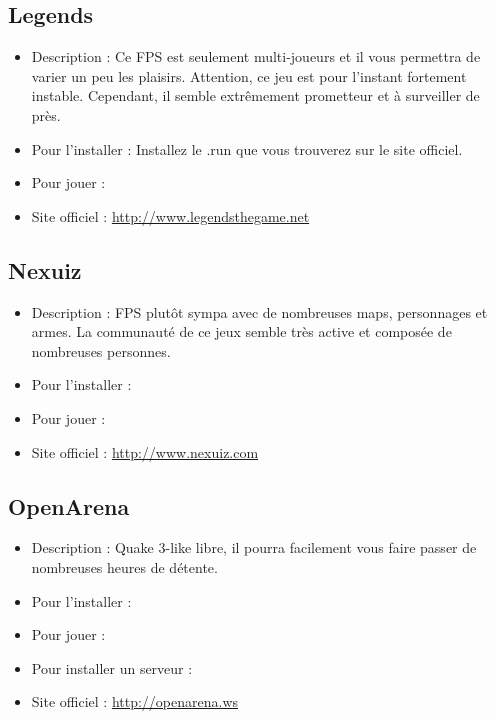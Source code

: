 \subsection{Legends}
\begin{itemize}
\begingroup
{}
\item Description : Ce FPS est seulement multi-joueurs et il vous permettra de varier un peu les plaisirs. Attention, ce jeu est pour l'instant fortement instable. Cependant, il semble extrêmement prometteur et à surveiller de près.{\par}
\endgroup
\item Pour l'installer : Installez le .run que vous trouverez sur le site officiel.{\par}
\item Pour jouer : 
\item Site officiel : \url{http://www.legendsthegame.net}{\par}
\end{itemize}
\subsection{Nexuiz}
\begin{itemize}
\begingroup
{}
\item Description : FPS plutôt sympa avec de nombreuses maps, personnages et armes. La communauté de ce jeux semble  très active et composée de nombreuses personnes.{\par}
\item Pour l'installer : 
\item Pour jouer : 
\item Site officiel : \url{http://www.nexuiz.com}{\par}
\endgroup
\end{itemize}
\subsection{OpenArena}
\begin{itemize}
\begingroup
{}
\item Description : Quake 3-like libre, il pourra facilement vous faire passer de nombreuses heures de détente.\par
\item Pour l'installer : 
\item Pour jouer : 
\item Pour installer un serveur : 
\item Site officiel : \url{http://openarena.ws}{\par}
\endgroup
\end{itemize}
